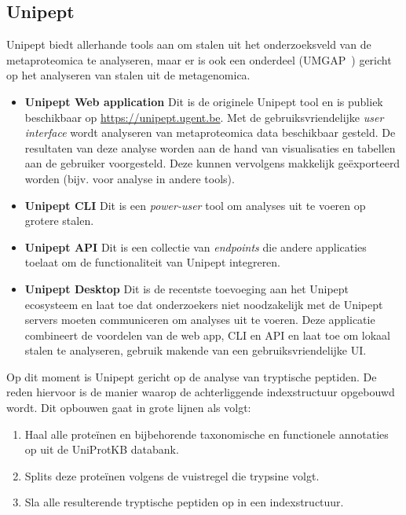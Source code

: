 \subsection{Unipept}\label{subsec:unipept-introductie}
Unipept biedt allerhande tools aan om stalen uit het onderzoeksveld van de metaproteomica te analyseren, maar er is ook een onderdeel (UMGAP~\cite{UMGAP_paper}) gericht op het analyseren van stalen uit de metagenomica.

\begin{itemize}
    \item \textbf{Unipept Web application} Dit is de originele Unipept tool en is publiek beschikbaar op \url{https://unipept.ugent.be}.
    Met de gebruiksvriendelijke \textit{user interface} wordt analyseren van metaproteomica data beschikbaar gesteld.
    De resultaten van deze analyse worden aan de hand van visualisaties en tabellen aan de gebruiker voorgesteld.
    Deze kunnen vervolgens makkelijk geëxporteerd worden (bijv. voor analyse in andere tools).
    \item \textbf{Unipept CLI} Dit is een \textit{power-user} tool om analyses uit te voeren op grotere stalen.
    \item \textbf{Unipept API} Dit is een collectie van \textit{endpoints} die andere applicaties toelaat om de functionaliteit van Unipept integreren.
    \item \textbf{Unipept Desktop} Dit is de recentste toevoeging aan het Unipept ecosysteem en laat toe dat onderzoekers niet noodzakelijk met de Unipept servers moeten communiceren om analyses uit te voeren.
    Deze applicatie combineert de voordelen van de web app, CLI en API en laat toe om lokaal stalen te analyseren, gebruik makende van een gebruiksvriendelijke UI\@.

\end{itemize}

Op dit moment is Unipept gericht op de analyse van tryptische peptiden.
De reden hiervoor is de manier waarop de achterliggende indexstructuur opgebouwd wordt.
Dit opbouwen gaat in grote lijnen als volgt:

\begin{enumerate}
    \item Haal alle proteïnen en bijbehorende taxonomische en functionele annotaties op uit de UniProtKB databank.
    \item Splits deze proteïnen volgens de vuistregel die trypsine volgt.
    \item Sla alle resulterende tryptische peptiden op in een indexstructuur.
\end{enumerate}

